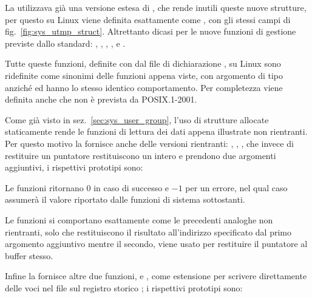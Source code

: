 La  utilizzava già una versione estesa di , che
rende inutili queste nuove strutture, per questo su Linux  viene
definita esattamente come , con gli stessi campi di
fig.~\ref{fig:sys_utmp_struct}. Altrettanto dicasi per le nuove funzioni di
gestione previste dallo standard: , ,
, ,  e .

Tutte queste funzioni, definite con  dal file di dichiarazione
, su Linux sono ridefinite come sinonimi delle funzioni
appena viste, con argomento di tipo  anziché  ed
hanno lo stesso identico comportamento. Per completezza viene definita anche
 che non è prevista da POSIX.1-2001.

Come già visto in sez.~\ref{sec:sys_user_group}, l'uso di strutture allocate
staticamente rende le funzioni di lettura dei dati appena illustrate non
rientranti. Per questo motivo la  fornisce anche delle versioni
rientranti: , , , che
invece di restituire un puntatore restituiscono un intero e prendono due
argomenti aggiuntivi, i rispettivi prototipi sono:

\begin{funcproto}{
}

{Le funzioni ritornano $0$ in caso di successo e $-1$ per un errore, nel qual
  caso  assumerà il valore riportato dalle funzioni di sistema
  sottostanti.}
\end{funcproto}

Le funzioni si comportano esattamente come le precedenti analoghe non
rientranti, solo che restituiscono il risultato all'indirizzo specificato dal
primo argomento aggiuntivo  mentre il secondo, 
viene usato per restituire il puntatore al buffer stesso.

Infine la  fornisce altre due funzioni,  e
, come estensione per scrivere direttamente delle voci nel file
sul registro storico ; i rispettivi prototipi sono:

